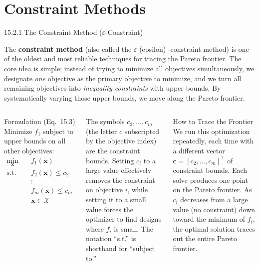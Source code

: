 \documentclass[aspectratio=169,10pt]{beamer}
\newcommand{\bx}{\mathbf{x}}
\begin{document}
\section{Constraint Methods}

\begin{frame}[allowframebreaks]{15.2.1 The Constraint Method ($\varepsilon$-Constraint)}

The \textbf{constraint method} (also called the $\varepsilon$ (epsilon)
-constraint method) is one of the oldest and most reliable techniques for
tracing the Pareto frontier.  The core idea is simple: instead of trying to
minimize all objectives simultaneously, we designate \emph{one} objective as
the primary objective to minimize, and we turn all remaining objectives into
\emph{inequality constraints} with upper bounds.  By systematically varying
those upper bounds, we move along the Pareto frontier.

\begin{columns}
\begin{block}{Formulation (Eq.\ 15.3)}
  Minimize $f_1$ subject to upper bounds on all other objectives:
  \[
    \begin{aligned}
      \min_{\bx} &\quad f_1(\bx) \\
      \text{s.t.} &\quad f_2(\bx) \le c_2 \\
                  &\quad \vdots \\
                  &\quad f_m(\bx) \le c_m \\
                  &\quad \bx \in \mathcal{X}
    \end{aligned}
  \]
\end{block}

The symbols $c_2, \ldots, c_m$ (the letter $c$ subscripted by the objective
index) are the constraint bounds.  Setting $c_i$ to a large value effectively
removes the constraint on objective $i$, while setting it to a small value
forces the optimizer to find designs where $f_i$ is small.  The notation
``s.t.'' is shorthand for ``subject to.''

\begin{block}{How to Trace the Frontier}
  We run this optimization repeatedly, each time with a different vector
  $\mathbf{c} = [c_2, \ldots, c_m]^\top$ of constraint bounds.  Each solve
  produces one point on the Pareto frontier.  As $c_i$ decreases from a
  large value (no constraint) down toward the minimum of $f_i$, the optimal
  solution traces out the entire Pareto frontier.
\end{block}


\end{columns}
\end{frame}
\end{document}
